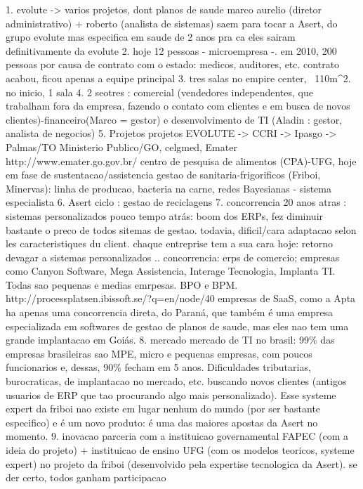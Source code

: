 1. evolute -> varios projetos, dont planos de saude
	marco aurelio (diretor administrativo) + roberto (analista de sistemas) saem para tocar a Asert, do grupo evolute mas especifica em saude
	de 2 anos pra ca eles sairam definitivamente da evolute
2. hoje 12 pessoas - microempresa -. em 2010, 200 pessoas por causa de contrato com o estado: medicos, auditores, etc. contrato acabou, ficou apenas a equipe principal
3. tres salas no empire center, ~110m^2. no inicio, 1 sala
4. 2 seotres : comercial (vendedores independentes, que trabalham fora da empresa, fazendo o contato com clientes e em busca de novos clientes)-financeiro(Marco = gestor) e desenvolvimento de TI (Aladin : gestor, analista de negocios)
5. Projetos
	projetos EVOLUTE -> CCRI -> Ipasgo -> Palmas/TO 
	Ministerio Publico/GO, celgmed, Emater http://www.emater.go.gov.br/
	centro de pesquisa de alimentos (CPA)-UFG, hoje em fase de sustentacao/assistencia
	gestao de sanitaria-frigorificos (Friboi, Minervas): linha de producao, bacteria na carne, redes Bayesianas - sistema especialista
6. Asert ciclo : gestao de reciclagens
7. concorrencia
	20 anos atras : sistemas personalizados
	pouco tempo atrás: boom dos ERPs, fez diminuir bastante o preco de todos sitemas de gestao. todavia, dificil/cara adaptacao selon les caracteristiques du client. chaque entreprise tem a sua cara
	hoje: retorno devagar a sistemas personalizados
	.. concorrencia: 
		erps de comercio; empresas como Canyon Software, Mega Assistencia, Interage Tecnologia, Implanta TI. Todas sao pequenas e medias emrpesas.
		BPO e BPM. http://processplatsen.ibissoft.se/?q=en/node/40
		empresas de SaaS, como a Apta
		ha apenas uma concorrencia direta, do Paraná, que também é uma empresa especializada em softwares de gestao de planos de saude, mas eles nao tem uma grande implantacao em Goiás.
8. mercado
	mercado de TI no brasil: 99\% das empresas brasileiras sao MPE, micro e pequenas empresas, com poucos funcionarios e, dessas, 90\% fecham em 5 anos. Dificuldades tributarias, burocraticas, de implantacao no mercado, etc.
	buscando novos clientes (antigos usuarios de ERP que tao procurando algo mais personalizado). Esse systeme expert da friboi nao existe em lugar nenhum do mundo (por ser bastante especifico) e é um novo produto: é uma das maiores apostas da Asert no momento.
9. inovacao
	parceria com a instituicao governamental FAPEC (com a ideia do projeto) + instituicao de ensino UFG (com os modelos teoricos, systeme expert) no projeto da friboi (desenvolvido pela expertise tecnologica da Asert). se der certo, todos ganham participacao

